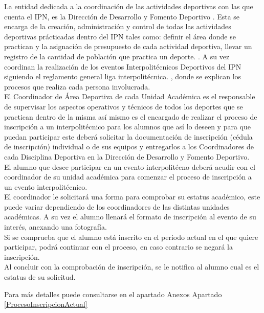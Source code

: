 \noindent La entidad dedicada a la coordinación de las actividades deportivas con las que cuenta el IPN, es la Dirección de Desarrollo y Fomento Deportivo \cite{DDyFD}. Esta se encarga de la creación, administración y control de todas las actividades deportivas prácticadas dentro del IPN tales como: definir el área donde se practican y la asignación de presupuesto de cada actividad deportiva, llevar un registro de la cantidad de población que practica un deporte. \cite{Reglamento}.	
\noindent A su vez coordinan la realización de los eventos Interpolitécnicos Deportivos del IPN siguiendo el reglamento general liga interpolitécnica. \cite{Reglamento}, donde se explican los  procesos que realiza cada persona involucrada.\\
\noindent El Coordinador de Área Deportiva de cada Unidad Académica es el responsable de supervisar los aspectos operativos y técnicos de todos los deportes que se practican dentro de la misma así mismo es el encargado de realizar el proceso de inscripción a un interpolitécnico para los alumnos que así lo deseen y para que puedan participar este deberá solicitar la documentación de inscripción (cédula de inscripción) individual o de sus equipos y entregarlos a los Coordinadores de cada Disciplina Deportiva en la Dirección de Desarrollo y Fomento Deportivo. \cite{Reglamento} \\
\noindent  El alumno que desee participar en un evento interpolitécno deberá acudir con el coordinador de su unidad académica para comenzar el proceso de inscripción a un evento interpolitécnico. 
\\El coordinador le solicitará una forma para comprobar su estatus académico, este puede variar dependiendo de los coordinadores de las distintas unidades académicas. A su vez el alumno llenará el formato de inscripción al evento de su interés, anexando una fotografía. 
\\ Si se comprueba que el alumno está inscrito en el periodo actual en el que quiere participar, podrá continuar con el proceso, en caso contrario se negará la inscripción. \cite{Reglamento}
\\ Al concluir con la comprobación de inscripción, se le notifica al alumno cual es el estatus de su solicitud. 

\noindent Para más detalles puede consultarse en el apartado Anexos Apartado \ref{ProcesoInscripcionActual}


